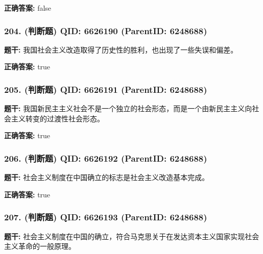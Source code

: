 \documentclass[12pt,UTF8]{ctexart}
\begin{document}
\textbf{正确答案:}
false

\vspace{0.3em}\hrulefill\vspace{0.7em}

\subsubsection*{204. (判断题) \small QID: 6626190 (ParentID: 6248688)}

\textbf{题干:}
我国社会主义改造取得了历史性的胜利，也出现了一些失误和偏差。



\textbf{正确答案:}
true

\vspace{0.3em}\hrulefill\vspace{0.7em}

\subsubsection*{205. (判断题) \small QID: 6626191 (ParentID: 6248688)}

\textbf{题干:}
我国新民主主义社会不是一个独立的社会形态，而是一个由新民主主义向社会主义转变的过渡性社会形态。



\textbf{正确答案:}
true

\vspace{0.3em}\hrulefill\vspace{0.7em}

\subsubsection*{206. (判断题) \small QID: 6626192 (ParentID: 6248688)}

\textbf{题干:}
社会主义制度在中国确立的标志是社会主义改造基本完成。



\textbf{正确答案:}
true

\vspace{0.3em}\hrulefill\vspace{0.7em}

\subsubsection*{207. (判断题) \small QID: 6626193 (ParentID: 6248688)}

\textbf{题干:}
社会主义制度在中国的确立，符合马克思关于在发达资本主义国家实现社会主义革命的一般原理。
\end{document}
